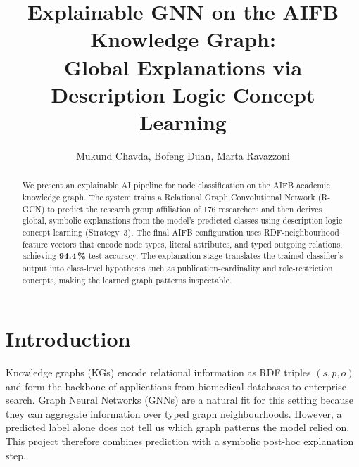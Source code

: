\documentclass[runningheads]{llncs}
\begin{document}
\title{Explainable GNN on the AIFB Knowledge Graph:\\
Global Explanations via Description Logic Concept Learning}


\author{Mukund Chavda, Bofeng Duan, Marta Ravazzoni}


\maketitle

\begin{abstract}
We present an explainable AI pipeline for node classification on the AIFB academic knowledge graph.
The system trains a Relational Graph Convolutional Network (R-GCN) to predict the research group
affiliation of 176 researchers and then derives global, symbolic explanations from the model's
predicted classes using description-logic concept learning (Strategy~3).
The final AIFB configuration uses RDF-neighbourhood feature vectors that encode node types,
literal attributes, and typed outgoing relations, achieving \textbf{94.4\,\%} test accuracy.
The explanation stage translates the trained classifier's output into class-level hypotheses such as
publication-cardinality and role-restriction concepts, making the learned graph patterns inspectable.
\end{abstract}


\setcounter{tocdepth}{2}
\tableofcontents
\clearpage

\section{Introduction}

Knowledge graphs (KGs) encode relational information as RDF triples $(s, p, o)$ and form the backbone
of applications from biomedical databases to enterprise search.
Graph Neural Networks (GNNs) are a natural fit for this setting because they can aggregate information
over typed graph neighbourhoods.  However, a predicted label alone does not tell us which graph patterns
the model relied on.  This project therefore combines prediction with a symbolic post-hoc explanation step.
\end{document}
